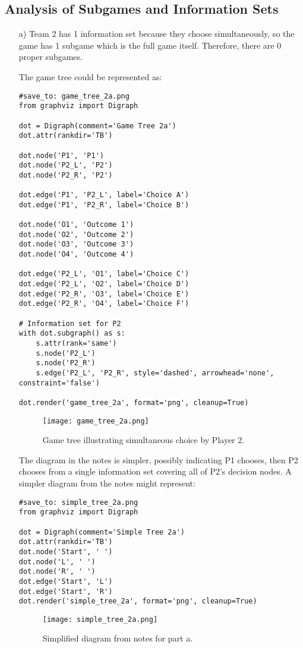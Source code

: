 \subsection*{Analysis of Subgames and Information Sets}
\begin{enumerate}
    \item[a)] Team 2 has 1 information set because they choose simultaneously, so the game has 1 subgame which is the full game itself. Therefore, there are 0 proper subgames.
    
    The game tree could be represented as:
\begin{verbatim}
#save_to: game_tree_2a.png
from graphviz import Digraph

dot = Digraph(comment='Game Tree 2a')
dot.attr(rankdir='TB')

dot.node('P1', 'P1')
dot.node('P2_L', 'P2')
dot.node('P2_R', 'P2')

dot.edge('P1', 'P2_L', label='Choice A')
dot.edge('P1', 'P2_R', label='Choice B')

dot.node('O1', 'Outcome 1')
dot.node('O2', 'Outcome 2')
dot.node('O3', 'Outcome 3')
dot.node('O4', 'Outcome 4')

dot.edge('P2_L', 'O1', label='Choice C')
dot.edge('P2_L', 'O2', label='Choice D')
dot.edge('P2_R', 'O3', label='Choice E')
dot.edge('P2_R', 'O4', label='Choice F')

# Information set for P2
with dot.subgraph() as s:
    s.attr(rank='same')
    s.node('P2_L')
    s.node('P2_R')
    s.edge('P2_L', 'P2_R', style='dashed', arrowhead='none', constraint='false')

dot.render('game_tree_2a', format='png', cleanup=True)
\end{verbatim}
    \begin{figure}[H]
    \centering
    \texttt{[image: game\_tree\_2a.png]}
    \caption{Game tree illustrating simultaneous choice by Player 2.}
    \label{fig:game_tree_2a}
    \end{figure}
    The diagram in the notes is simpler, possibly indicating P1 chooses, then P2 chooses from a single information set covering all of P2's decision nodes.
    A simpler diagram from the notes might represent:
\begin{verbatim}
#save_to: simple_tree_2a.png
from graphviz import Digraph

dot = Digraph(comment='Simple Tree 2a')
dot.attr(rankdir='TB')
dot.node('Start', ' ')
dot.node('L', ' ')
dot.node('R', ' ')
dot.edge('Start', 'L')
dot.edge('Start', 'R')
dot.render('simple_tree_2a', format='png', cleanup=True)
\end{verbatim}
    \begin{figure}[H]
    \centering
    \texttt{[image: simple\_tree\_2a.png]}
    \caption{Simplified diagram from notes for part a.}
    \label{fig:simple_tree_2a}
    \end{figure}


\end{enumerate}
